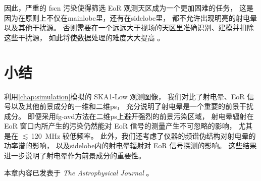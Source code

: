 因此，严重的 \ac{fscn} 污染使得筛选 EoR 观测天区成为一个更加困难的任务，
这是因为在原则上不仅在\ac{mainlobe}里，还有在\ac{sidelobe}里，
都不允许出现明亮的射电晕以及其他干扰源。
否则需要在一个远远大于视场的天区里准确识别、建模并扣除这些干扰源，
如此将使数据处理的难度大大提高 \cite{pober2013,pober2016}。


\section{小结}

利用\autoref{chap:simulation}模拟的 SKA1-Low 观测图像，
我们对比了射电晕、EoR 信号以及其他前景成分的一维和二维\ac{ps}，
充分说明了射电晕是一个重要的前景干扰成分。
即便采用\ac{fg-avd}方法在二维\ac{ps}上避开强烈的前景污染区域，
射电晕辐射在 EoR 窗口内所产生的污染仍然能对 EoR 信号的测量产生不可忽略的影响，
尤其是在 $\lesssim$\,\SI{120}{\MHz} 较低频率。
此外，我们还考虑了仪器的频谱伪结构对射电晕的功率谱的影响，
以及\ac{sidelobe}内的射电晕辐射对 EoR 信号探测的影响。
这些结果进一步说明了射电晕作为前景成分的重要性。

本章内容已发表于 \textit{The Astrophysical Journal} \cite{li.halo}。


